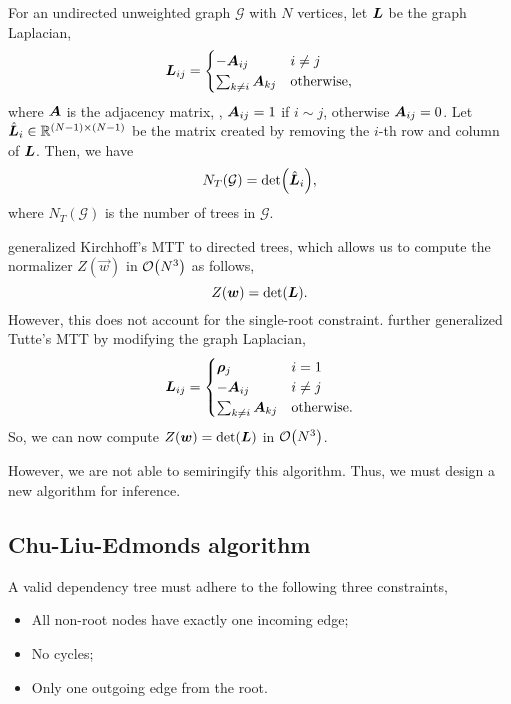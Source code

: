 \begin{theorem}
    For an undirected unweighted graph $\mathcal{G}$ with $N$ vertices, let
    $\bm{L}$ be the graph Laplacian, \[
        \bm{L}_{ij} = \begin{cases}
            -\bm{A}_{ij}                & i \neq j            \\
            \sum_{k \neq i} \bm{A}_{kj} & \mathrm{otherwise},
        \end{cases}
    \]
    where $\bm{A}$ is the adjacency matrix, \ie, $\bm{A}_{ij}=1$ if $i \sim j$,
    otherwise $\bm{A}_{ij}=0$. Let $\hat{\bm{L}}_i \in \mathbb{R}^{(N-1)\times(N-1)}$ be the
    matrix created by removing the $i$-th row and column of $\bm{L}$. Then, we
    have \[
        N_T(\mathcal{G}) = \det{\hat{\mat{L}}_i}
        ,\]
    where $N_T(\mathcal{G})$ is the number of trees in $\mathcal{G}$.
\end{theorem}

\citet{tutte1948dissection} generalized Kirchhoff's MTT to directed trees,
which allows us to compute the normalizer $Z(\vec{w})$ in $\bigo{N^3}$ as
follows,
\[
    Z(\bm{w}) = \det{\mat{L}}
    .\]
However, this does not account for the single-root constraint.
\citet{koo2007structured} further generalized Tutte's MTT by modifying the
graph Laplacian, \[
    \bm{L}_{ij} = \begin{cases}
        \bm{\rho}_j                 & i = 1               \\
        -\bm{A}_{ij}                & i \neq j            \\
        \sum_{k \neq i} \bm{A}_{kj} & \mathrm{otherwise}.
    \end{cases}
\]
So, we can now compute $Z(\vec{w}) = \det{\mat{L}}$ in $\bigo{N^3}$.

However, we are not able to semiringify this algorithm. Thus, we must design a
new algorithm for inference.

\subsection{Chu-Liu-Edmonds algorithm}

A valid dependency tree must adhere to the following three constraints,
\begin{itemize}
    \item All non-root nodes have exactly one incoming edge;
    \item No cycles;
    \item Only one outgoing edge from the root.
\end{itemize}

